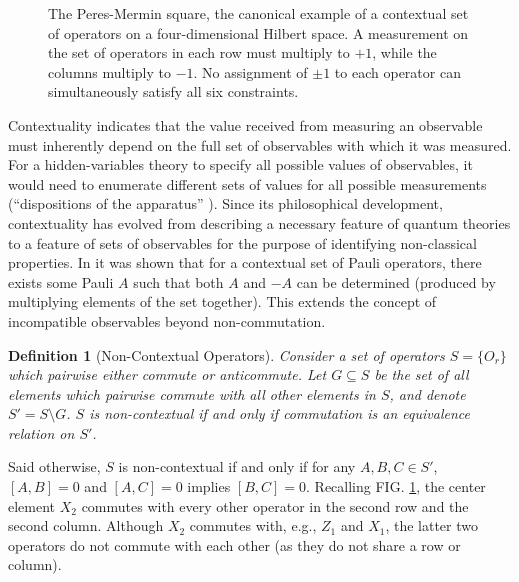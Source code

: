 \documentclass[%
 aip,
 amsmath,amssymb,
 reprint,%
]{revtex4-1}
\newtheorem{identity}{{Definition}}
\begin{document}
\begin{figure}
    \centering
    
    \caption{The Peres-Mermin square, the canonical example of a contextual set of operators on a four-dimensional Hilbert space. A measurement on the set of operators in each row must multiply to $+1$, while the columns multiply to $-1$. No assignment of $\pm1$ to each operator can simultaneously satisfy all six constraints.}
    \label{fig:PMSquare}
\end{figure}

Contextuality indicates that the value received from measuring an observable must inherently depend on the full set of observables with which it was measured. %
For a hidden-variables theory to specify all possible values of observables, it would need to enumerate different sets of values for all possible measurements (\enquote{dispositions of the apparatus} \cite{bell1966Problem}). Since its philosophical development, contextuality has evolved from describing a necessary feature of quantum theories to a feature of sets of observables for the purpose of identifying non-classical properties. In \cite{Kirby_Contextuality} it was shown that for a contextual set of Pauli operators, there exists some Pauli $A$  such that both $A$ and $-A$ can be determined (produced by multiplying elements of the set together). This extends the concept of incompatible observables beyond non-commutation.


 \indent  
\begin{identity}[Non-Contextual Operators]%
\label{id:nc}
    Consider a set of operators $S = \{O_r\}$ which pairwise either commute or anticommute. Let $G \subseteq S$ be the set of all elements which pairwise commute with all other elements in $S$, and denote $S' = S \setminus G$. $S$ is non-contextual if and only if commutation is an equivalence relation on $S'$.
\end{identity}    
    

Said otherwise, $S$ is non-contextual if and only if for any $A, B, C \in S'$, $[A,B] = 0$ and $[A,C] = 0$ implies $[B, C] = 0$. Recalling FIG. \ref{fig:PMSquare}, the center element $X_2$ commutes with every other operator in the second row and the second column. Although $X_2$ commutes with, e.g., $Z_1$ and $X_1$, the latter two operators do not commute with each other (as they do not share a row or column). 
\end{document}
